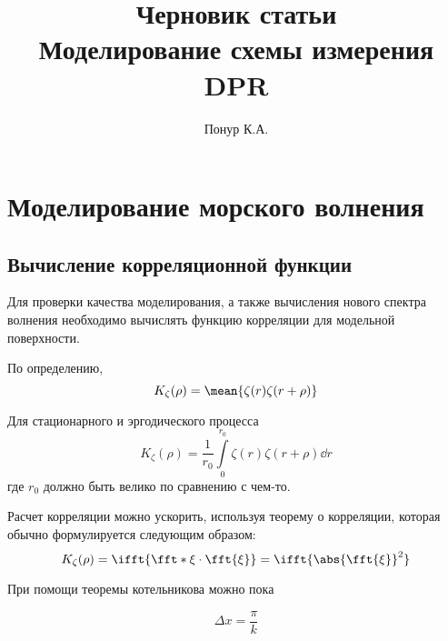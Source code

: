 
\title{Черновик статьи \\ \textbf{Моделирование схемы измерения DPR}}
\author{Понур К.А.}

\maketitle
\tableofcontents



\section{Моделирование морского волнения}%
\label{sec:modelirovanie_morskogo_volneniia}


\subsection{Вычисление корреляционной функции}%
\label{sub:vychislenie_korreliatsionnoi_funktsii}


Для проверки качества моделирования, а также вычисления нового спектра волнения 
необходимо вычислять функцию корреляции для модельной поверхности.

По определению, 
\begin{equation}
    K_{\zeta}(\rho) = \mean{ \zeta(r) \zeta(r+\rho) }
\end{equation}

Для стационарного и эргодического процесса
\begin{equation}
    \label{eq:defK:2}
    K_{\zeta}(\rho) = \frac{1}{r_0} \int\limits_{0}^{r_0}  \zeta(r) \zeta(r+\rho)
    \dd r
\end{equation}
где $r_0$ должно быть велико по сравнению с чем-то.

Расчет корреляции можно ускорить, используя теорему о корреляции, которая
обычно формулируется следующим образом:
\begin{equation}
    K_{\zeta}(\rho) = \ifft{\fft*{\xi} \cdot \fft{\xi}} = 
    \ifft{\abs{\fft{\xi}}^2}
\end{equation}

При помощи теоремы котельникова можно пока

\begin{equation}
    \label{eq:}
    \Delta x = \frac{\pi}{k}
\end{equation}







